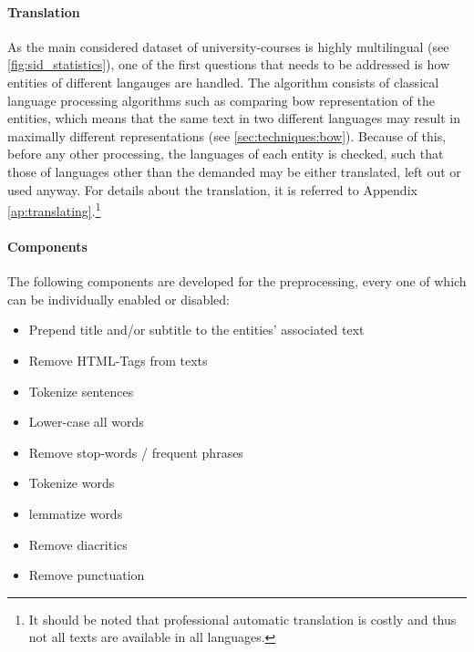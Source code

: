 \paragraph{Translation} As the main considered dataset of university-courses is highly multilingual (see \autoref{fig:sid_statistics}), one of the first questions that needs to be addressed is how entities of different langauges are handled. The algorithm consists of classical language processing algorithms such as comparing \gls{bow} representation of the entities, which means that the same text in two different languages may result in maximally different representations (see \autoref{sec:techniques:bow}). Because of this, before any other processing, the languages of each entity is checked, such that those of languages other than the demanded may be either translated, left out or used anyway. For details about the translation, it is referred to Appendix \ref{ap:translating}.\footnote{It should be noted that professional automatic translation is costly and thus not all texts are available in all languages.}

\paragraph{Components} The following components are developed for the preprocessing, every one of which can be individually enabled or disabled:

\begin{itemize}
	\item Prepend title and/or subtitle to the entities' associated text 
	\item Remove HTML-Tags from texts 
	\item Tokenize sentences 
	\item Lower-case all words
	\item Remove stop-words / frequent phrases
	\item Tokenize words
	\item \Gls{lemma}tize words
	\item Remove diacritics
	\item Remove punctuation 
\end{itemize}

